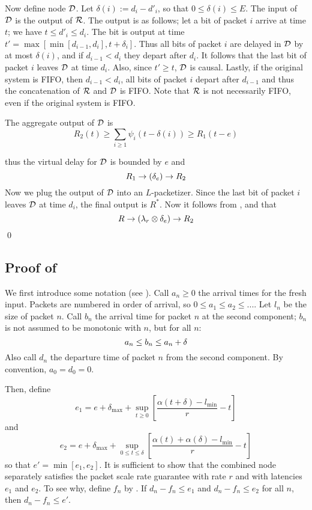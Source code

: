 Now define node $\mathcal D$. Let $\delta(i):=d_{i}-d'_i$, so that
$0 \leq \delta(i) \leq E$.  The input of $\mathcal D$ is the output
of $\mathcal R$. The output is as follows; let a bit of packet $i$
arrive at time $t$; we have $t\leq d'_{i}\leq d_{i}$. The bit
is output at time $t'=\max[\min[d_{i-1}, d_{i}],t+\delta_i]$.
Thus all bits of packet $i$ are delayed in $\mathcal D$ by at most
$\delta(i)$, and if $d_{i-1}<d_{i}$ they depart after $d_{i}$.
It follows that the last bit of packet $i$ leaves $\mathcal D$ at
time $d_{i}$. Also, since $t'\geq t$, $\mathcal D$ is causal.
Lastly, if the original system is FIFO, then $d_{i-1}<d_{i}$,
all bits of packet $i$ depart after $d_{i-1}$ and thus the
concatenation of $\mathcal R$ and $\mathcal D$ is FIFO. Note that
$\mathcal R$ is not necessarily FIFO, even if the original system
is FIFO.


The aggregate output of $\mathcal D$ is
$$
R_2(t)\geq \sum_{i\geq 1}\psi_i(t-\delta(i))\geq R_1(t-e)
$$

thus the virtual delay for $\mathcal D$ is bounded by $e$ and
\begin{equation}\mylabel{eq-ascpr288}
  R_1 \rightarrow (\delta_e) \rightarrow R_2
\end{equation}
Now we plug the output of $\mathcal D$ into an $L$-packetizer.
Since the last bit of packet $i$ leaves $\mathcal D$ at time $d_i$,
the final output is $R^*$. Now it follows from
,  and
 that
 $$R \rightarrow (\lambda_r \otimes \delta_e) \rightarrow R_2
 $$
\qed

\subsection{Proof of }

We first introduce some notation (see ).
Call $a_n \geq 0$ the arrival times for the fresh input.
Packets are numbered in order of arrival, so $0 \leq a_1 \leq
a_2 \leq ...$. Let $l_n$ be the size of packet $n$. Call $b_n$
the arrival time for packet $n$ at the second component; $b_n$
is not assumed to be monotonic with $n$, but for all $n$:
\begin{equation}\mylabel{eq-Elkxj872}
 a_n \leq b_n \leq a_n + \delta
\end{equation}
Also call $d_n$ the departure time of packet $n$ from the
second component. By convention, $a_0=d_0=0$.

Then, define
$$e_1=e+ \delta_{\max} +
  \sup_{t \geq 0}[ \frac{\alpha(t+ \delta) - l_{\min}}{r}- t]
$$
and
$$
e_2
=
e+ \delta_{\max} +
 \sup_{0 \leq t \leq \delta}
  [ \frac{\alpha(t)+ \alpha(\delta) -
l_{\min}}{r}- t]
$$
so that $e'= \min[e_1, e_2]$. It is sufficient to show that
the combined node separately satisfies the packet scale rate
guarantee with rate $r$ and with latencies $e_1$ and $e_2$. To
see why, define $f_n$ by . If $d_n - f_n
\leq e_1$ and $d_n - f_n \leq e_2$ for all $n$, then $d_n -
f_n \leq e'$.


